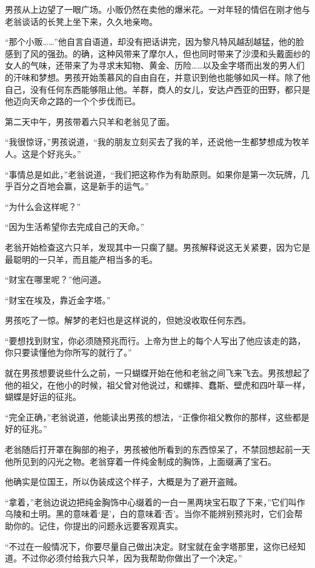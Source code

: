 \documentclass[twoside,openany]{book}
\begin{document}
男孩从上边望了一眼广场。小贩仍然在卖他的爆米花。一对年轻的情侣在刚才他与老翁谈话的长凳上坐下来，久久地亲吻。

“那个小贩……”他自言自语道，却没有把话讲完，因为黎凡特风越刮越猛，他的脸感到了风的强劲。的确，这种风带来了摩尔人，但也同时带来了沙漠和头戴面纱的女人的气味，还带来了为寻求末知物、黄金、历险……以及金字塔而出发的男人们的汗味和梦想。男孩开始羡慕风的自由自在，并意识到他也能够如风一样。除了他自己，没有任何东西能够阻止他。羊群，商人的女儿，安达卢西亚的田野，都只是他迈向天命之路的一个个步伐而已。

第二天中午，男孩带着六只羊和老翁见了面。

“我很惊讶，”男孩说道，“我的朋友立刻买去了我的羊，还说他一生都梦想成为牧羊人。这是个好兆头。”

“事情总是如此，”老翁说道，“我们把这称作为有助原则。如果你是第一次玩牌，几乎百分之百地会赢，这是新手的运气。”

“为什么会这样呢？”

“因为生活希望你去完成自己的天命。”

老翁开始检查这六只羊，发现其中一只瘸了腿。男孩解释说这无关紧要，因为它是最聪明的一只羊，而且能产相当多的毛。

“财宝在哪里呢？”他问道。

“财宝在埃及，靠近金字塔。”

男孩吃了一惊。解梦的老妇也是这样说的，但她没收取任何东西。

“要想找到财宝，你必须随预兆而行。上帝为世上的每个人写出了他应该走的路，你只要读懂他为你所写的就行了。”

就在男孩想要说些什么之前，一只蝴蝶开始在他和老翁之间飞来飞去。男孩想起了他的祖父，在他小的时候，祖父曾对他说过，和螺摔、蠢斯、壁虎和四叶草一样，蝴蝶是好运的征兆。

“完全正确，”老翁说道，他能读出男孩的想法，“正像你祖父教你的那样，这些都是好的征兆。”

老翁随后打开罩在胸部的袍子，男孩被他所看到的东西惊呆了，不禁回想起前一天他所见到的闪光之物。老翁穿着一件纯金制成的胸饰，上面缀满了宝石。

他确实是位国王，所以伪装成这个样子，大概是为了避开盗贼。

“拿着，”老翁边说边把纯金胸饰中心缀着的一白一黑两块宝石取了下来，”它们叫作乌陵和土明。黑的意味着‘是'，白的意味着‘否'。当你不能辨别预兆时，它们会帮助你的。记住，你提出的问题永远要客观真实。

“不过在一般情况下，你要尽量自己做出决定。财宝就在金字塔那里，这你已经知道。不过你必须付给我六只羊，因为我帮助你做出了一个决定。”
\end{document}
